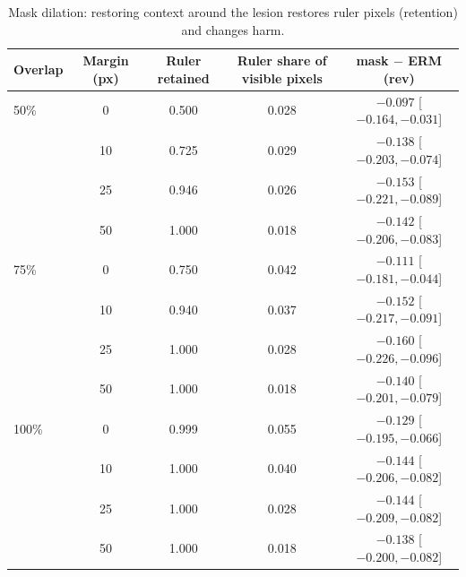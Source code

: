\begin{table}[H]\centering\small
\caption{Mask dilation: restoring context around the lesion restores ruler pixels (retention) and changes harm.}\label{tab:dil}
\begin{tabular}{lcccc}\toprule
Overlap & Margin (px) & Ruler retained & Ruler share of visible pixels & mask $-$ ERM (rev) \\\midrule
50\% & 0 & 0.500 & 0.028 & $-0.097$ [$-0.164, -0.031$] \\
 & 10 & 0.725 & 0.029 & $-0.138$ [$-0.203, -0.074$] \\
 & 25 & 0.946 & 0.026 & $-0.153$ [$-0.221, -0.089$] \\
 & 50 & 1.000 & 0.018 & $-0.142$ [$-0.206, -0.083$] \\
75\% & 0 & 0.750 & 0.042 & $-0.111$ [$-0.181, -0.044$] \\
 & 10 & 0.940 & 0.037 & $-0.152$ [$-0.217, -0.091$] \\
 & 25 & 1.000 & 0.028 & $-0.160$ [$-0.226, -0.096$] \\
 & 50 & 1.000 & 0.018 & $-0.140$ [$-0.201, -0.079$] \\
100\% & 0 & 0.999 & 0.055 & $-0.129$ [$-0.195, -0.066$] \\
 & 10 & 1.000 & 0.040 & $-0.144$ [$-0.206, -0.082$] \\
 & 25 & 1.000 & 0.028 & $-0.144$ [$-0.209, -0.082$] \\
 & 50 & 1.000 & 0.018 & $-0.138$ [$-0.200, -0.082$] \\
\bottomrule\end{tabular}
\end{table}
